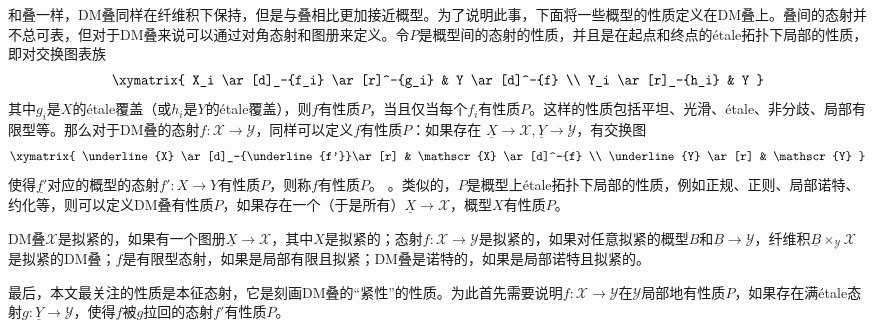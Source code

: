 和叠一样，DM叠同样在纤维积下保持，但是与叠相比更加接近概型。为了说明此事，下面将一些概型的性质定义在DM叠上。叠间的态射并不总可表，但对于DM叠来说可以通过对角态射和图册来定义。令$ P $是概型间的态射的性质，并且是在起点和终点的\'etale拓扑下局部的性质，即对交换图表族
$$\xymatrix{
	X_i \ar[d]_-{f_i} \ar[r]^-{g_i} & Y \ar[d]^-{f} \\
	Y_i \ar[r]_-{h_i} & Y
}$$
其中$ g_i $是$ X $的\'etale覆盖（或$ h_i $是$ Y $的\'etale覆盖），则$ f $有性质$ P $，当且仅当每个$ f_i $有性质$ P $。这样的性质包括平坦、光滑、\'etale、非分歧、局部有限型等。那么对于DM叠的态射$ f:\mathscr{X}\to \mathscr{Y} $，同样可以定义$ f $有性质$ P $：如果存在 $ \underline{X}\to\mathscr{X},\underline{Y}\to\mathscr{Y} $，有交换图
$$ \xymatrix{
	\underline{X} \ar[d]_-{\underline{f'}}\ar[r] & \mathscr{X} \ar[d]^-{f} \\
	\underline{Y} \ar[r] & \mathscr{Y}
} $$
使得$ \underline{f'} $对应的概型的态射$ f':X\to Y $有性质$ P $，则称$ f $有性质$ P $。
。类似的，$ P $是概型上\'etale拓扑下局部的性质，例如正规、正则、局部诺特、约化等，则可以定义DM叠有性质$ P $，如果存在一个（于是所有）$ \underline{X}\to\mathscr{X} $，概型$ X $有性质$ P $。

DM叠$ \mathscr{X} $是拟紧的，如果有一个图册$ \underline{X}\to \mathscr{X} $，其中$ X $是拟紧的；态射$ f:\mathscr{X}\to \mathscr{Y} $是拟紧的，如果对任意拟紧的概型$ B $和$ \underline{B}\to \mathscr{Y} $，纤维积$ \underline{B}\times_{\mathscr{Y}}\mathscr{X} $是拟紧的DM叠；$ f $是有限型态射，如果是局部有限且拟紧；DM叠是诺特的，如果是局部诺特且拟紧的。

最后，本文最关注的性质是本征态射，它是刻画DM叠的“紧性”的性质。为此首先需要说明$ f:\mathscr{X}\to \mathscr{Y} $在$ \mathscr{Y} $局部地有性质$ P $，如果存在满\'etale态射$ g:\underline{Y}\to \mathscr{Y} $，使得$ f $被$ g $拉回的态射$ f' $有性质$ P $。


